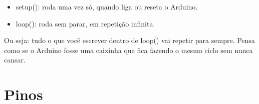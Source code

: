 \documentclass{report}
\begin{document}
	\begin{itemize}
		\item setup(): roda uma vez só, quando liga ou reseta o Arduino.
		\item loop(): roda sem parar, em repetição infinita.
	\end{itemize}
	
	Ou seja: tudo o que você escrever dentro de loop() vai repetir para sempre. Pensa como se o Arduino fosse uma caixinha que fica fazendo o mesmo ciclo sem nunca cansar.

	\section{Pinos}
	
\end{document}
